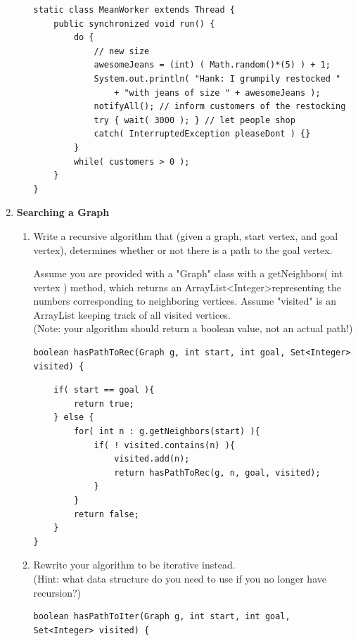 \documentclass[11pt]{article}
\newenvironment{answer}{\large\lstset{basicstyle=\tiny\ttfamily}\color{white}}{}
\newenvironment{answer}{\large\lstset{basicstyle=\large\ttfamily}\color{red}}{}
\begin{document}
\begin{enumerate}
\begin{enumerate}
\begin{answer}
\begin{lstlisting}
static class MeanWorker extends Thread {
    public synchronized void run() {
        do {
			// new size
            awesomeJeans = (int) ( Math.random()*(5) ) + 1;
            System.out.println( "Hank: I grumpily restocked "
                + "with jeans of size " + awesomeJeans );
            notifyAll(); // inform customers of the restocking
            try { wait( 3000 ); } // let people shop
            catch( InterruptedException pleaseDont ) {}
        }
        while( customers > 0 );
    }
}
\end{lstlisting}
\end{answer}
    \end{enumerate}
    
\newpage
\item \textbf{Searching a Graph}
	\begin{enumerate}
		\item
			Write a recursive algorithm that (given a graph, start vertex, and goal vertex),
			determines whether or not there is a path to the goal vertex.

            Assume you are provided with a "Graph" class with a getNeighbors( int vertex ) method, which returns an ArrayList\textless Integer\textgreater representing the numbers corresponding to neighboring vertices. Assume "visited" is an ArrayList keeping track of all visited vertices. \\
			(Note: your algorithm should return a boolean value, not an actual path!)
\begin{verbatim}
boolean hasPathToRec(Graph g, int start, int goal, Set<Integer> visited) {
\end{verbatim}
			
\begin{answer}
\begin{lstlisting}
	if( start == goal ){
		return true;
	} else {
		for( int n : g.getNeighbors(start) ){
			if( ! visited.contains(n) ){
				visited.add(n);
				return hasPathToRec(g, n, goal, visited);
			}
		}
		return false;
	}
}
\end{lstlisting}
\end{answer}
		            
		\item
			Rewrite your algorithm to be iterative instead. \\
			(Hint: what data structure do you need to use if you no longer have recursion?)
\begin{verbatim}
boolean hasPathToIter(Graph g, int start, int goal, Set<Integer> visited) {
\end{verbatim}	
			

\end{enumerate}
\end{enumerate}
\end{document}
